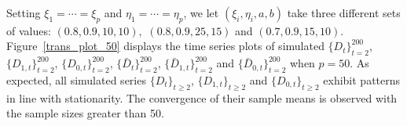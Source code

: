 \documentclass[12pt]{article}
\newcommand{\0}{{\bf 0}}
\begin{document}
Setting $\xi_1=\cdots=\xi_p$ and $\eta_1=\cdots=\eta_p$, we let
$(\xi_i, \eta_i, a, b)$ take three different sets of values: 
$(0.8,0.9,10,10),$ $(0.8,0.9,25,15)$ and $(0.7,0.9,15,10)$.
Figure~\ref{trans_plot_50} displays the time series plots of simulated  $\{D_t\}_{t=2}^{200}$, $\{D_{1,t}\}_{t=2}^{200}$, $\{D_{0,t}\}_{t=2}^{200}$, $\{\bar D_t\}_{t=2}^{200}$, $\{\bar D_{1,t}\}_{t=2}^{200}$ and $\{\bar D_{0,t}\}_{t=2}^{200}$ when $p=50$. %
As expected, all simulated series $\{D_t\}_{t\geq2}$, $\{D_{1,t}\}_{t\geq2}$ and $\{D_{0,t}\}_{t\geq2}$ exhibit patterns in line with stationarity. The convergence of their sample means is observed with the sample sizes greater than 50. %
\end{document}

